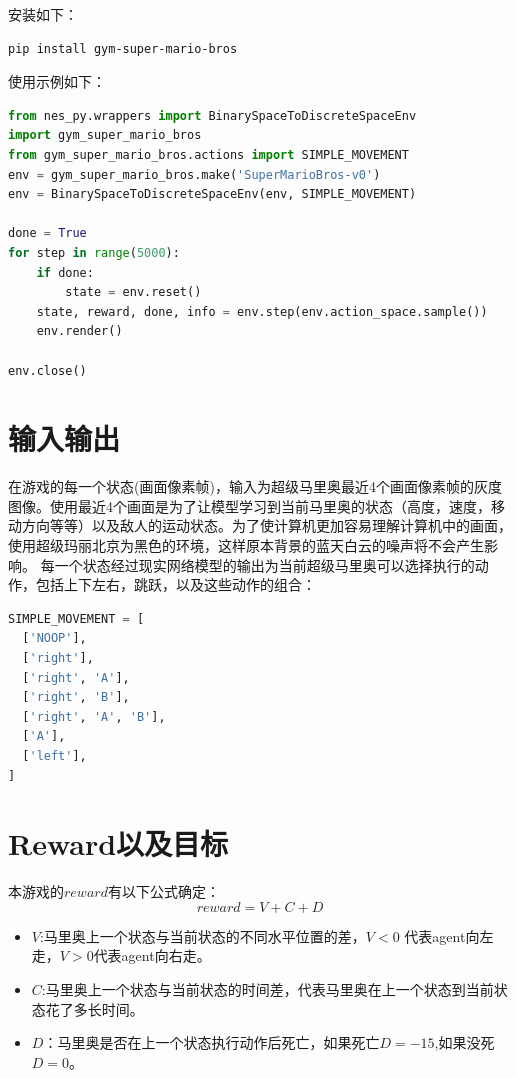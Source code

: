 安装如下：
\begin{lstlisting}[language={bash}]
  pip install gym-super-mario-bros
\end{lstlisting}
使用示例如下：
\cleardoublepage
\begin{lstlisting}[language={python}, caption={super-mario控制}]
from nes_py.wrappers import BinarySpaceToDiscreteSpaceEnv
import gym_super_mario_bros
from gym_super_mario_bros.actions import SIMPLE_MOVEMENT
env = gym_super_mario_bros.make('SuperMarioBros-v0')
env = BinarySpaceToDiscreteSpaceEnv(env, SIMPLE_MOVEMENT)

done = True
for step in range(5000):
    if done:
        state = env.reset()
    state, reward, done, info = env.step(env.action_space.sample())
    env.render()

env.close()
\end{lstlisting}


\section{输入输出}
在游戏的每一个状态(画面像素帧)，输入为超级马里奥最近4个画面像素帧的灰度图像。使用最近4个画面是为了让模型学习到当前马里奥的状态（高度，速度，移动方向等等）以及敌人的运动状态。为了使计算机更加容易理解计算机中的画面，使用超级玛丽北京为黑色的环境，这样原本背景的蓝天白云的噪声将不会产生影响。
每一个状态经过现实网络模型的输出为当前超级马里奥可以选择执行的动作，包括上下左右，跳跃，以及这些动作的组合：
\begin{lstlisting}[language={python}]
SIMPLE_MOVEMENT = [
  ['NOOP'],
  ['right'],
  ['right', 'A'],
  ['right', 'B'],
  ['right', 'A', 'B'],
  ['A'],
  ['left'],
]
\end{lstlisting}
\section{Reward以及目标}
本游戏的$reward$有以下公式确定：
\begin{equation}
  reward = V + C + D
\end{equation}
\begin{itemize}
  \item $V$:马里奥上一个状态与当前状态的不同水平位置的差，$V<0$ 代表agent向左走，$V>0$代表agent向右走。
  \item $C$:马里奥上一个状态与当前状态的时间差，代表马里奥在上一个状态到当前状态花了多长时间。
  \item $D$：马里奥是否在上一个状态执行动作后死亡，如果死亡$D=-15$,如果没死$D=0$。
\end{itemize}

